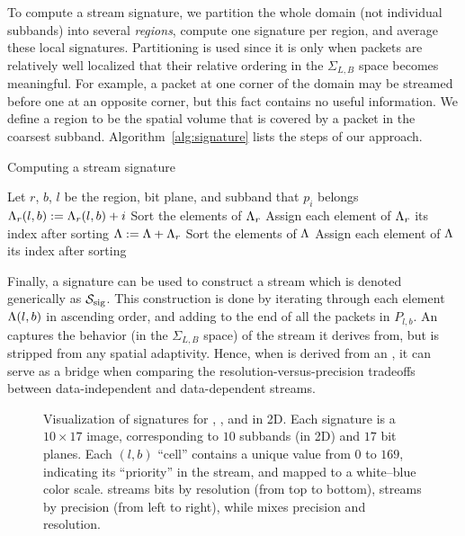 To compute a stream signature, we partition the whole domain (not individual subbands) into several
\emph{regions}, compute one signature per region, and average these local signatures. Partitioning
is used since it is only when packets are relatively well localized that their relative ordering in
the $\Sigma_{L,B}$ space becomes meaningful. For example, a packet at one corner of the domain may
be streamed before one at an opposite corner, but this fact contains no useful information. We
define a region to be the spatial volume that is covered by a packet in the coarsest subband.
Algorithm~\ref{alg:signature} lists the steps of our approach.

\begin{algorithm}[h]
  \caption{Computing a stream signature}
  \begin{algorithmic}[1]
			\State Let $r$, $b$, $l$ be the region, bit plane, and subband that $p_i$ belongs
			\State $\sgn_r(l,b) := \sgn_r(l,b)+i$
		\EndFor
			\State Sort the elements of $\sgn_r$
			\State Assign each element of $\sgn_r$ its index after sorting
			\State $\sgn := \sgn+\sgn_r$
		\EndFor
		\State Sort the elements of $\sgn$
		\State Assign each element of $\sgn$ its index after sorting
	\end{algorithmic}
	\label{alg:signature}
\end{algorithm}

Finally, a signature can be used to construct a stream which is denoted generically as $\ssig$. This
construction is done by iterating through each element $\sgn(l,b)$ in ascending order, and adding to
the end of \ssig all the packets in $P_{l,b}$. An \ssig captures the behavior (in the $\Sigma_{L,B}$
space) of the stream it derives from, but is stripped from any spatial adaptivity. Hence, when \ssig
is derived from an \sopt, it can serve as a bridge when comparing the resolution-versus-precision
tradeoffs between data-independent and data-dependent streams.

\begin{figure}[t]
\centering
\caption{Visualization of signatures for \slvl, \sbit, and \swav in 2D. Each signature is a
$10\times 17$ image, corresponding to $10$ subbands (in 2D) and $17$ bit planes. Each $(l,b)$
``cell'' contains a unique value from $0$ to $169$, indicating its ``priority'' in the stream, and
mapped to a white--blue color scale. \slvl streams bits by resolution (from top to bottom), \sbit
streams by precision (from left to right), while \swav mixes precision and resolution.}
\label{fig:example-signatures}
\end{figure}
